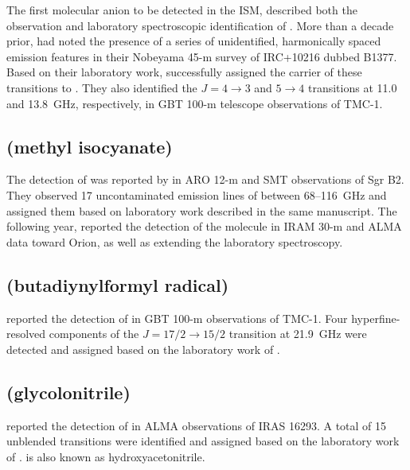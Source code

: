 \documentclass[twocolumn]{aastex631}
\newcommand{\update}[1]{{#1}}
\begin{document}
	The first molecular anion to be detected in the ISM, \citet{McCarthy:2006tk} described both the observation and laboratory spectroscopic identification of .  More than a decade prior, \citet{Kawaguchi:1995tx} had noted the presence of a series of unidentified, harmonically spaced emission features in their Nobeyama 45-m survey of IRC+10216 dubbed B1377.  Based on their laboratory work, \citet{McCarthy:2006tk} successfully assigned the carrier of these transitions to .  They also identified the $J = 4\rightarrow3$ and $5\rightarrow4$ transitions at 11.0 and 13.8~GHz, respectively, in GBT 100-m telescope observations of TMC-1.
	
	\subsection{ (methyl isocyanate)}
	\label{CH3NCO}
	
	The detection of  was reported by \citet{Halfen:2015ez} in ARO 12-m and SMT observations of Sgr B2.  They observed 17 uncontaminated emission lines of  between 68--116~GHz and assigned them based on laboratory work described in the same manuscript.  The following year, \citet{Cernicharo:2016fm} reported the detection of the molecule in IRAM 30-m and ALMA data toward Orion, as well as extending the laboratory spectroscopy.
	
	\subsection{ (butadiynylformyl radical)}
	\label{HC5O}
	
	\citet{McGuire:2017ud} reported the detection of  in GBT 100-m observations of TMC-1.  Four hyperfine-resolved components of the $J = 17/2\rightarrow15/2$ transition at 21.9~GHz were detected and assigned based on the laboratory work of \citet{Mohamed:2005ku}.
	
	\subsection{\update{ (glycolonitrile)}}
	\label{HOCH2CN}
	
	\update{\citet{Zeng:2019dd} reported the detection of \ce{HOCH2CN} in ALMA observations of IRAS 16293.  A total of 15 unblended transitions were identified and assigned based on the laboratory work of  \citet{Margules:2017ii}.  \ce{HOCH2CN} is also known as hydroxyacetonitrile.}
	
\end{document}
